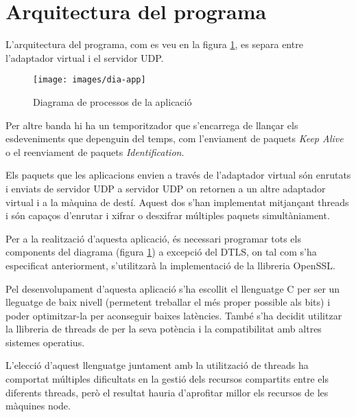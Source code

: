 \section{Arquitectura del programa}
L'arquitectura del programa, com es veu en la figura \ref{F:dia-app}, es separa entre l'adaptador virtual i el servidor UDP.
\begin{figure}[htb]
\centering
\texttt{[image: images/dia-app]}
\caption{Diagrama de processos de la aplicació}
\label{F:dia-app}
\end{figure}
\label{arch-temp}
Per altre banda hi ha un temporitzador que s'encarrega de llançar els esdeveniments que depenguin del temps, com l'enviament de paquets \emph{Keep Alive} o el reenviament de paquets \emph{Identification}.

Els paquets que les aplicacions envien a través de l'adaptador virtual són enrutats i enviats de servidor UDP a servidor UDP on retornen a un altre adaptador virtual i a la màquina de destí. Aquest dos s'han implementat mitjançant threads i són capaços d'enrutar i xifrar o desxifrar múltiples paquets simultàniament.

Per a la realització d'aquesta aplicació, és necessari programar tots els components del diagrama (figura \ref{F:dia-app}) a excepció del DTLS, on tal com s'ha especificat anteriorment, s'utilitzarà la implementació de la llibreria OpenSSL.

Pel desenvolupament d'aquesta aplicació s'ha escollit el llenguatge C per ser un lleguatge de baix nivell (permetent treballar el més proper possible als bits) i poder optimitzar-la per aconseguir baixes latències. També s'ha decidit utilitzar la llibreria de threads de  per la seva potència i la compatibilitat amb altres sistemes operatius.

L'elecció d'aquest llenguatge juntament amb la utilització de threads ha comportat múltiples dificultats en la gestió dels recursos compartits entre els diferents threads, però el resultat hauria d'aprofitar millor els recursos de les màquines node.


